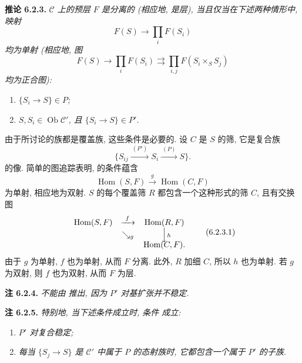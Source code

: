\medskip
\noindent{}\textbf{推论 6.2.3.}
\textit{\(\mathscr C\) 上的预层 \(F\) 是分离的 (相应地, 是层),
当且仅当在下述两种情形中, 映射}
\[
  F(S)\longrightarrow\prod_iF(S_i)
\]
\textit{均为单射 (相应地, 图}
\[
  F(S)\longrightarrow\prod_iF(S_i)
  \rightrightarrows\prod_{i,j}F(S_i\times_SS_j)
\]
\textit{均为正合图):}
\begin{enumerate}
  \item[(i)] \textit{\(\{S_i\to S\}\in P\);}
  \item[(ii)] \textit{\(S,S_i\in\operatorname{Ob}\mathscr C'\),
    且 \(\{S_i\to S\}\in P'\).}
\end{enumerate}

由于所讨论的族都是覆盖族, 这些条件是必要的.
设 \(C\) 是 \(S\) 的筛, 它是复合族
\[
  \{S_{ij}\xrightarrow{\ (P')\ }S_i\xrightarrow{\ (P)\ }S\}.
\]
的像. 简单的图追踪表明, 的条件蕴含
\[
  \operatorname{Hom}(S,F)
  \xrightarrow{\ g\ }\operatorname{Hom}(C,F)
\]
为单射, 相应地为双射. \(S\) 的每个覆盖筛 \(R\)
都包含一个这种形式的筛 \(C\), 且有交换图
\[
\begin{array}{ccccc}
  \operatorname{Hom}(S,F) & \xrightarrow{\ f\ } &
    \operatorname{Hom}(R,F)\\
  & \searrow_{\scriptstyle g} & \Big\downarrow\rlap{\(\scriptstyle h\)}\\[-0.25em]
  & & \operatorname{Hom}(C,F).
\end{array}
\tag{6.2.3.1}\label{sga3:iv:corollary:6:2:3:eq:6:2:3:1:01}
\]
由于 \(g\) 为单射, \(f\) 也为单射, 从而 \(F\) 分离.
此外, \(R\) 加细 \(C\), 所以 \(h\) 也为单射.
若 \(g\) 为双射, 则 \(f\) 也为双射, 从而 \(F\) 为层.

\medskip
\noindent{}\textbf{注 6.2.4.}
\textit{不能由
 推出,
因为 \(P'\) 对基扩张并不稳定.}

\medskip
\noindent{}\textbf{注 6.2.5.}
\textit{特别地, 当下述条件成立时, 条件
 成立:}
\begin{enumerate}
  \item[(i)] \textit{\(P'\) 对复合稳定;}
  \item[(ii)] \textit{每当
    \(\{S_j\to S\}\) 是 \(\mathscr C'\) 中属于 \(P\) 的态射族时,
    它都包含一个属于 \(P'\) 的子族.}
\end{enumerate}

